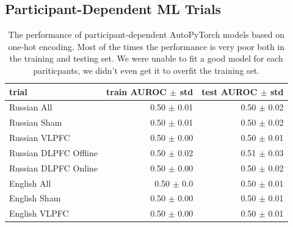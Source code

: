 \documentclass[12pt,letterpaper]{article}
\begin{document}
\begin{enumerate}
\newpage
\section{Participant-Dependent ML Trials}

\begin{table}[h!]
\centering

\caption{The performance of participant-dependent AutoPyTorch models based on one-hot encoding. Most of the times the performance is very poor both in the training and testing set. We were unable to fit a good model for each pariticpants, we didn't even get it to overfit the training set.}
\begin{tabular}{|l|r|r|}
\hline
trial &  train AUROC \(\pm\) std &  test AUROC \(\pm\) std \\
\hline
Russian All &    0.50 \(\pm\)   0.01 &   0.50 \(\pm\)  0.02 \\ \hline
Russian Sham &    0.50 \(\pm\)   0.01 &   0.50 \(\pm\)  0.02 \\ \hline
Russian VLPFC &    0.50 \(\pm\)   0.00 &   0.50 \(\pm\)  0.01 \\ \hline
Russian DLPFC Offline &    0.50 \(\pm\)   0.02 &   0.51 \(\pm\)  0.03 \\ \hline
Russian DLPFC Online &    0.50 \(\pm\)   0.00 &   0.50 \(\pm\)  0.02 \\ \hline
English All &    0.50 \(\pm\)   0.0 &   0.50 \(\pm\)  0.01 \\ \hline
English Sham &    0.50 \(\pm\)   0.00 &   0.50 \(\pm\)  0.01 \\ \hline
English VLPFC &    0.50 \(\pm\)   0.00 &   0.50 \(\pm\)  0.01 \\ \hline
\end{tabular}
\end{table}


\end{enumerate}
\end{document}
